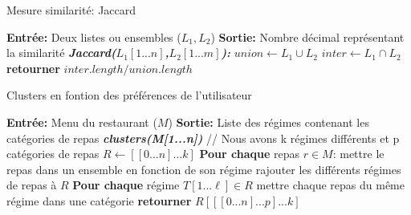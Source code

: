 \documentclass[11pt]{article}
\begin{document}
\begin{algorithm}
    \caption{Mesure similarité: Jaccard}
    \begin{algorithmic}[1]
    \Statex \textbf{Entrée:} Deux listes ou ensembles ($L_1, L_2$)
    \Statex \textbf{Sortie:} Nombre décimal représentant la similarité
    \State \textbf{\textit{Jaccard($L_1[1...n]$,$L_2[1...m]$):}}
    \State \hspace{0.5cm} $union \leftarrow L_1 \cup L_2$
    \State \hspace{0.5cm} $inter \leftarrow L_1 \cap L_2$
    \State \hspace{0.5cm} \textbf{retourner} $inter.length/union.length$
    \end{algorithmic}
\end{algorithm}

\begin{algorithm}
    \caption{Clusters en fontion des préférences de l'utilisateur}
    \begin{algorithmic}[1]
    \Statex \textbf{Entrée:} Menu du restaurant ($M$)
    \Statex \textbf{Sortie:} Liste des régimes contenant les catégories de repas
    \State \textbf{\textit{clusters(M[1...n])}}
    \State \hspace{0.5cm} // Nous avons k régimes différents et p catégories de repas
    \State \hspace{0.5cm} $R \leftarrow [[0...n]...k]$
    \State \hspace{0.5cm} \textbf{Pour chaque} repas $r \in M$:
    \State \hspace{1cm} mettre le repas dans un ensemble en fonction de son régime
    \State \hspace{1cm} rajouter les différents régimes de repas à $R$
    \State \hspace{0.5cm} \textbf{Pour chaque} régime $T[1...\ell] \in R$ 
    \State \hspace{1cm} mettre chaque repas du même régime dans une catégorie 
    \State \hspace{0.5cm} \textbf{retourner} $R[[[0...n]...p]...k]$
    \end{algorithmic}
\end{algorithm}

\newpage
\end{document}
